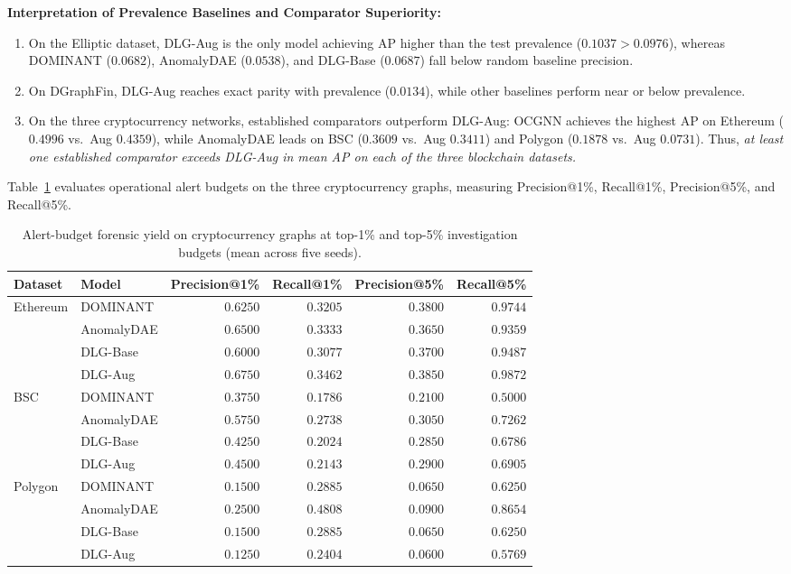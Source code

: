 \documentclass[11pt,a4paper]{article}
\begin{document}
\textbf{Interpretation of Prevalence Baselines and Comparator Superiority:}
\begin{enumerate}
    \item On the Elliptic dataset, DLG-Aug is the only model achieving AP higher than the test prevalence ($0.1037 > 0.0976$), whereas DOMINANT ($0.0682$), AnomalyDAE ($0.0538$), and DLG-Base ($0.0687$) fall below random baseline precision.
    \item On DGraphFin, DLG-Aug reaches exact parity with prevalence ($0.0134$), while other baselines perform near or below prevalence.
    \item On the three cryptocurrency networks, established comparators outperform DLG-Aug: OCGNN achieves the highest AP on Ethereum ($0.4996$ vs.\ Aug $0.4359$), while AnomalyDAE leads on BSC ($0.3609$ vs.\ Aug $0.3411$) and Polygon ($0.1878$ vs.\ Aug $0.0731$). Thus, \textit{at least one established comparator exceeds DLG-Aug in mean AP on each of the three blockchain datasets.}
\end{enumerate}

Table~\ref{tab:alert_budget} evaluates operational alert budgets on the three cryptocurrency graphs, measuring Precision@1\%, Recall@1\%, Precision@5\%, and Recall@5\%.

\begin{table}[htbp]
\centering\small
\caption{Alert-budget forensic yield on cryptocurrency graphs at top-1\% and top-5\% investigation budgets (mean across five seeds).}
\label{tab:alert_budget}
\begin{tabularx}{\textwidth}{llrrrr}\toprule
\textbf{Dataset} & \textbf{Model} & \textbf{Precision@1\%} & \textbf{Recall@1\%} & \textbf{Precision@5\%} & \textbf{Recall@5\%} \\\midrule
Ethereum & DOMINANT & $0.6250$ & $0.3205$ & $0.3800$ & $0.9744$ \\
 & AnomalyDAE & $0.6500$ & $0.3333$ & $0.3650$ & $0.9359$ \\
 & DLG-Base & $0.6000$ & $0.3077$ & $0.3700$ & $0.9487$ \\
 & DLG-Aug & $\mathbf{0.6750}$ & $\mathbf{0.3462}$ & $\mathbf{0.3850}$ & $\mathbf{0.9872}$ \\\midrule
BSC & DOMINANT & $0.3750$ & $0.1786$ & $0.2100$ & $0.5000$ \\
 & AnomalyDAE & $\mathbf{0.5750}$ & $\mathbf{0.2738}$ & $\mathbf{0.3050}$ & $\mathbf{0.7262}$ \\
 & DLG-Base & $0.4250$ & $0.2024$ & $0.2850$ & $0.6786$ \\
 & DLG-Aug & $0.4500$ & $0.2143$ & $0.2900$ & $0.6905$ \\\midrule
Polygon & DOMINANT & $0.1500$ & $0.2885$ & $0.0650$ & $0.6250$ \\
 & AnomalyDAE & $\mathbf{0.2500}$ & $\mathbf{0.4808}$ & $\mathbf{0.0900}$ & $\mathbf{0.8654}$ \\
 & DLG-Base & $0.1500$ & $0.2885$ & $0.0650$ & $0.6250$ \\
 & DLG-Aug & $0.1250$ & $0.2404$ & $0.0600$ & $0.5769$ \\\bottomrule
\end{tabularx}
\end{table}
\end{document}
